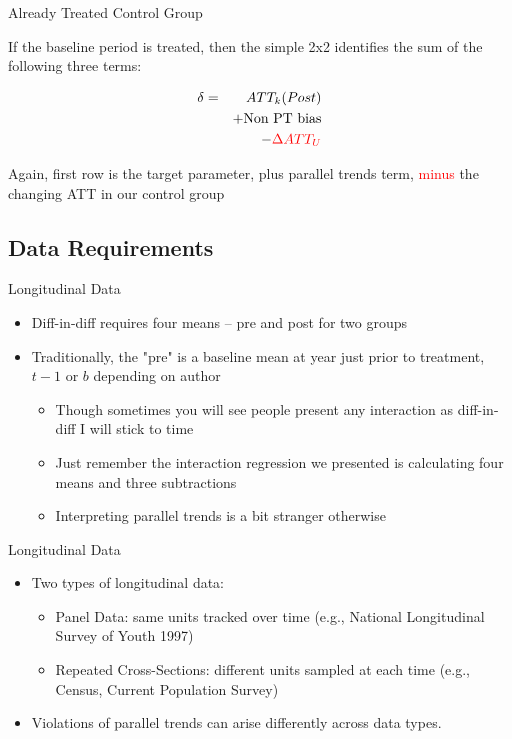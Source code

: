\documentclass{beamer}
\begin{document}
\begin{frame}{Already Treated Control Group}

If the baseline period is treated, then the simple 2x2 identifies the sum of the following three terms:

\begin{eqnarray*}
\delta &=& ATT_k(Post) \\&&+ \text{Non PT bias} \\&&- \textcolor{red}{\Delta ATT_U}
\end{eqnarray*}

Again, first row is the target parameter, plus parallel trends term, \textcolor{red}{minus} the changing ATT in our control group

\end{frame}

\subsection{Data Requirements}

\begin{frame}{Longitudinal Data}

\begin{itemize}

\item Diff-in-diff requires four means -- pre and post for two groups
\item Traditionally, the "pre" is a baseline mean at year just prior to treatment, $t-1$ or $b$ depending on author
	\begin{itemize}
	\item Though sometimes you will see people present any interaction as diff-in-diff I will stick to time
	\item Just remember the interaction regression we presented is calculating four means and three subtractions
	\item Interpreting parallel trends is a bit stranger otherwise
	\end{itemize}
\end{itemize}

\end{frame}

\begin{frame}{Longitudinal Data}

\begin{itemize}

\item Two types of longitudinal data:
    \begin{itemize}
      \item Panel Data: same units tracked over time (e.g., National Longitudinal Survey of Youth 1997)
      \item Repeated Cross-Sections: different units sampled at each time (e.g., Census, Current Population Survey)
    \end{itemize}
    \item Violations of parallel trends can arise differently across data types.
\end{itemize}

\end{frame}
\end{document}
